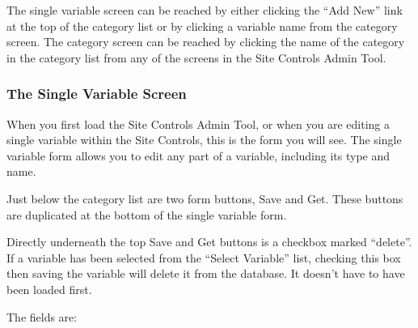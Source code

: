 The single variable screen can be reached by either clicking the ``Add New'' link at the top of the category list or by clicking a variable name from the category screen.  The category screen can be reached by clicking the name of the category in the category list from any of the screens in the Site Controls Admin Tool.

\subsubsection{The Single Variable Screen}

When you first load the Site Controls Admin Tool, or when you are editing a single variable within the Site Controls, this is the form you will see.  The single variable form allows you to edit any part of a variable, including its type and name.

Just below the category list are two form buttons, Save and Get.  These buttons are duplicated at the bottom of the single variable form.  

Directly underneath the top Save and Get buttons is a checkbox marked ``delete''.  If a variable has been selected from the ``Select Variable'' list, checking this box then saving the variable will delete it from the database.  It doesn't have to have been loaded first.

The fields are:

